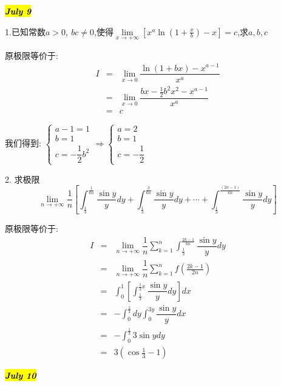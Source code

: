 \hl{\textbf{\textit{July 9}}}

1.已知常数$a>0,\ bc\neq 0$,使得$\lim\limits_{x\rightarrow+\infty}[x^a\ln(1+\frac{x}{b})-x]=c$,求$a,b,c$
\begin{solution}
	
	原极限等价于: 
	\begin{eqnarray*}
		I&=&\lim\limits_{x\rightarrow 0 }\dfrac{\ln(1+bx)-x^{a-1}}{x^a}\\
		&=&\lim\limits_{x\rightarrow 0 }\dfrac{bx-\frac{1}{2}b^2x^2-x^{a-1}}{x^a}\\
		&=&c
	\end{eqnarray*}
	
	我们得到: $\left\lbrace
	\begin{array}{l}
		a-1=1\\
		b=1\\
		c=-\dfrac{1}{2}b^2
	\end{array}
	\right. \Rightarrow \left\lbrace
	\begin{array}{l}
		a=2\\
		b=1\\
		c=-\dfrac{1}{2}
	\end{array}
	\right. $
\end{solution}

2. 求极限
$$\lim\limits_{n\rightarrow +\infty}\dfrac{1}{n}\left[\int_{\frac{1}{3}}^{\frac{1}{6n}}\dfrac{\sin y}{y}dy+\int_{\frac{1}{3}}^{\frac{3}{6n}}\dfrac{\sin y}{y}dy+\cdots+\int_{\frac{1}{3}}^{\frac{(2n-1)}{6n}}\dfrac{\sin y}{y}dy \right]$$
\begin{solution}
	
	原极限等价于: 
	\begin{eqnarray*}
		I&=&\lim\limits_{n\rightarrow +\infty}\dfrac{1}{n}\sum\limits_{k=1}^{n}\int_{\frac{1}{3}}^{\frac{2k-1}{6n}}\dfrac{\sin y}{y}dy\\
		&=&\lim\limits_{n\rightarrow +\infty}\dfrac{1}{n}\sum\limits_{k=1}^{n}f(\frac{2k-1}{2n})\\
		&=&\int_{0}^{1}[\int_{\frac{1}{3}}^{\frac{1}{3}x}\dfrac{\sin y}{y}dy]dx\\
		&=&-\int_{0}^{\frac{1}{3}}dy\int_{0}^{3y}\dfrac{\sin y}{y}dx\\
		&=&-\int_{0}^{\frac{1}{3}}3\sin ydy\\
		&=&3(\cos \frac{1}{3}-1)
	\end{eqnarray*}
\end{solution}

\hl{\textbf{\textit{July 10}}}

